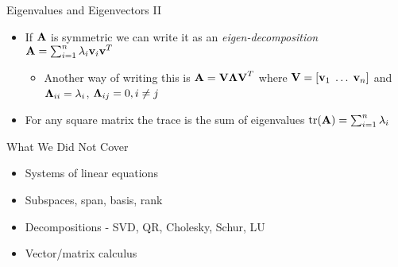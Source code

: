 \documentclass{beamer}
\begin{document}
\begin{frame}{Eigenvalues and Eigenvectors II}
\begin{itemize} 
  \item If $\textbf{A}$ is symmetric we can write it as an \emph{eigen-decomposition} $\textbf{A} = \sum_{i=1}^n \lambda_i\textbf{v}_i\textbf{v}^T$ 
\begin{itemize}
\item Another way of writing this is  $\textbf{A} = \textbf{V}\mbox{\boldmath$\Lambda$}\textbf{V}^T$ where $\textbf{V} = [\textbf{v}_1 \; \ldots \; \textbf{v}_n]$ and $\mbox{\boldmath$\Lambda$}_{ii} = \lambda_i$, $\mbox{\boldmath$\Lambda$}_{ij} = 0, i \neq j$  
\end{itemize} 
 \item For any square matrix the trace is the sum of eigenvalues $\mbox{tr}(\textbf{A}) = \sum_{i=1}^n \lambda_i$
\end{itemize}
\end{frame}


\begin{frame}{What We Did Not Cover}  
\begin{itemize} 
 \item Systems of linear equations 
 \item Subspaces, span, basis, rank 
 \item Decompositions - SVD, QR, Cholesky, Schur, LU 
 \item Vector/matrix calculus 
\end{itemize}
\end{frame}
\end{document}
